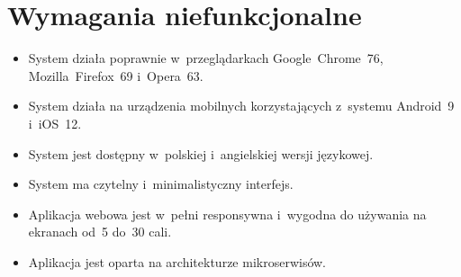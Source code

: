 \newpage

\section{Wymagania niefunkcjonalne}\label{sec:nonfunctional-requirements}
\begin{itemize}
    \item System działa poprawnie w~przeglądarkach Google~Chrome~76, Mozilla~Firefox~69 i~Opera~63.
    \item System działa na urządzenia mobilnych korzystających z~systemu Android~9 i~iOS~12.
    \item System jest dostępny w~polskiej i~angielskiej wersji językowej.
    \item System ma czytelny i~minimalistyczny interfejs.
    \item Aplikacja webowa jest w~pełni responsywna i~wygodna do używania na ekranach od~5 do~30 cali.
    \item Aplikacja jest oparta na architekturze mikroserwisów.
\end{itemize}
\thispagestyle{normal}

